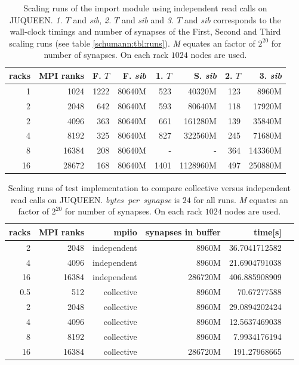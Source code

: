 \begin{table}[h!]
\begin{center}
\begin{tabular}{|r|r|r|r|r|r|r|r|}
\hline
racks & MPI ranks & F. $T$ & F. \emph{sib} & 1. $T$ & S. \emph{sib} & 2. $T$ & 3. \emph{sib} \\
\hline\hline
1  & 1024      & 1222 & 80640M & 523 & 40320M & 123 & 8960M \\
2  & 2048      & 642 & 80640M  & 593 & 80640M & 118 & 17920M\\
2  & 4096      & 363 & 80640M  & 661 & 161280M & 139 & 35840M\\
4  & 8192     & 325 & 80640M & 827 & 322560M & 245 & 71680M \\
8  & 16384    & 208 & 80640M & -   & - &  364 & 143360M \\
16  & 28672    & 168 & 80640M & 1401 & 1128960M & 497 & 250880M\\
\hline
\end{tabular}
\end{center}
\caption{Scaling runs of the import module using independent read calls on JUQUEEN. \emph{1. $T$} and \emph{sib}, \emph{2. $T$} and \emph{sib} and
  \emph{3. $T$} and \emph{sib} corresponds to the wall-clock timings and number of synapses of the First, Second and Third scaling runs (see table \ref{schumann:tbl:runs}). \emph{M} equates an factor of $2^{20}$ for number of synapses. On each rack $1024$ nodes are used.}
\label{schumann:tbl:scalruns}
\end{table}

\begin{table}[h!]
\begin{center}
\begin{tabular}{|r|r|r|r|r|r|}
\hline
racks & MPI ranks & mpiio & synapses in buffer & time[s] \\
\hline\hline
2  & 2048      & independent  &  8960M & 36.7041712582\\
4  & 4096      & independent  & 8960M  & 21.6904791038\\
16  & 16384      &  independent & 286720M  & 406.885908909\\
0.5  & 512      & collective  & 8960M  & 70.67277588\\
2  & 2048      & collective  & 8960M  & 29.0894202424\\
4  & 4096      & collective  & 8960M  & 12.5637469038\\
8  & 8192      & collective  &  8960M & 7.9934176194\\
16  & 16384      &  collective & 286720M  & 191.27968665\\
\hline
\end{tabular}
\end{center}
\caption{Scaling runs of test implementation to compare collective versus independent read calls on JUQUEEN. \emph{bytes~per~synapse} is $24$ for all runs.
  \emph{M} equates an factor of $2^{20}$ for number of synapses. On each rack $1024$ nodes are used.}
\label{schumann:tbl:indevscol}
\end{table}

